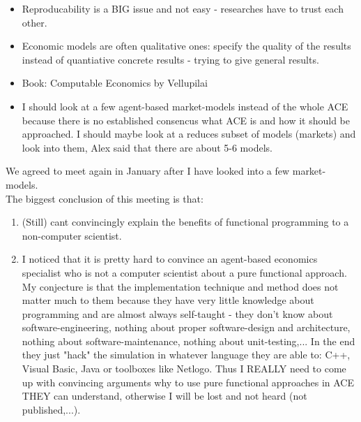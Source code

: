 \begin{itemize}
\item Reproducability is a BIG issue and not easy - researches have to trust each other.
\item Economic models are often qualitative ones: specify the quality of the results instead of quantiative concrete results - trying to give general results.
\item Book: Computable Economics by Vellupilai
\item I should look at a few agent-based market-models instead of the whole ACE because there is no established consencus what ACE is and how it should be approached. I should maybe look at a reduces subset of models (markets) and look into them, Alex said that there are about 5-6 models.
\end{itemize}

We agreed to meet again in January after I have looked into a few market-models. \\

The biggest conclusion of this meeting is that:
 
\begin{enumerate}
\item (Still) cant convincingly explain the benefits of functional programming to a non-computer scientist.
\item I noticed that it is pretty hard to convince an agent-based economics specialist who is not a computer scientist about a pure functional approach. My conjecture is that the implementation technique and method does not matter much to them because they have very little knowledge about programming and are almost always self-taught - they don't know about software-engineering, nothing about proper software-design and architecture, nothing about software-maintenance, nothing about unit-testing,... In the end they just "hack" the simulation in whatever language they are able to: C++, Visual Basic, Java or toolboxes like Netlogo. Thus I REALLY need to come up with convincing arguments why to use pure functional approaches in ACE THEY can understand, otherwise I will be lost and not heard (not published,...).
\end{enumerate}